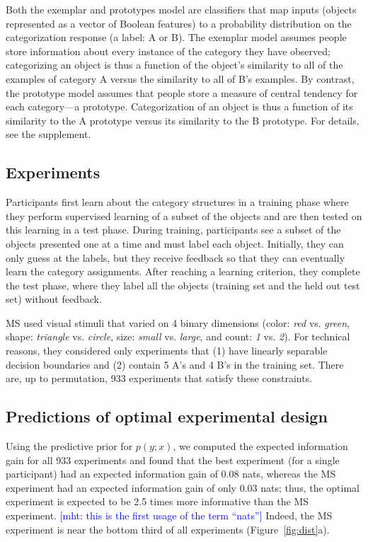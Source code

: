 \documentclass{article}
\newcommand{\mht}[1]{\textcolor{Blue}{[mht: #1]}}
\begin{document}
Both the exemplar and prototypes model are classifiers that map inputs (objects represented as a vector of Boolean features) to a probability distribution on the categorization response (a label: A or B).
The exemplar model assumes people store information about every instance of the category they have observed; categorizing an object is thus a function of the object's similarity to all of the examples of category A versus the similarity to all of B's examples.
By contrast, the prototype model assumes that people store a measure of central tendency for each category---a prototype.
Categorization of an object is thus a function of its similarity to the A prototype versus its similarity to the B prototype.
For details, see the supplement.

\subsection{Experiments}

Participants first learn about the category structures in a training phase where they perform supervised learning of a subset of the objects and are then tested on this learning in a test phase.
During training, participants see a subset of the objects presented one at a time and must label each object.
Initially, they can only guess at the labels, but they receive feedback so that they can eventually learn the category assignments.
After reaching a learning criterion, they complete the test phase, where they label all the objects (training set and the held out test set) without feedback.

MS used visual stimuli that varied on 4 binary dimensions (color: \emph{red} vs. \emph{green}, shape: \emph{triangle} vs. \emph{circle}, size: \emph{small} vs. \emph{large}, and count: \emph{1} vs. \emph{2}).
For technical reasons, they considered only experiments that (1) have linearly separable decision boundaries and (2) contain 5 A's and 4 B's in the training set.
There are, up to permutation, 933 experiments that satisfy these constraints.

\subsection{Predictions of optimal experimental design}

Using the predictive prior for $p(y; x)$, we computed the expected information gain for all 933 experiments and found that the best experiment (for a single participant) had an expected information gain of 0.08 nats, whereas the MS experiment had an expected information gain of only 0.03 nats; thus, the optimal experiment is expected to be 2.5 times more informative than the MS experiment.
\mht{this is the first usage of the term ``nats''}
Indeed, the MS experiment is near the bottom third of all experiments (Figure~\ref{fig:dist}a).
\end{document}
